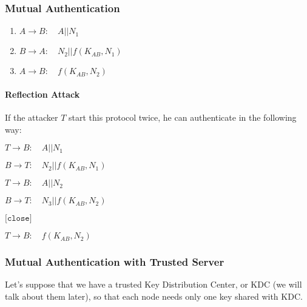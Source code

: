 \subsubsection{Mutual Authentication}
\begin{enumerate}
    \item $A\rightarrow B:\hspace{1em} A||N_1$
    \item $B\rightarrow A:\hspace{1em} N_2||f(K_{AB},N_1)$
    \item $A\rightarrow B:\hspace{1em} f(K_{AB},N_2)$
\end{enumerate}
\paragraph{Reflection Attack} If the attacker $T$ start this protocol twice, he can authenticate in the following way:
\begin{enumerate}
    \item $T\rightarrow B:\hspace{1em} A||N_1$
    \item $B\rightarrow T:\hspace{1em} N_2||f(K_{AB},N_1)$
    {\color{teal} \item{$T\rightarrow B:\hspace{1em} A||N_2$}}
    {\color{teal} \item $B\rightarrow T:\hspace{1em} N_3||f(K_{AB},N_2)$}
    {\color{teal} \item $\texttt{[close]}$}
    
    \item $T\rightarrow B:\hspace{1em} f(K_{AB},N_2)$
\end{enumerate}

\subsubsection{Mutual Authentication with Trusted Server}
Let's suppose that we have a trusted Key Distribution Center, or KDC (we will talk about them later), so that each node needs only one key shared with KDC. 

